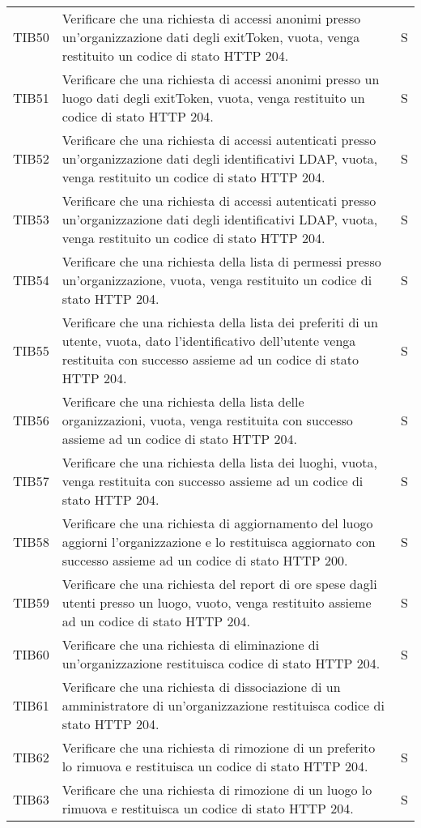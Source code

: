 {\begin{longtable}{ c C{13cm} C{1cm}}
TIB50 & Verificare che una richiesta di accessi anonimi presso un'organizzazione dati degli exitToken, vuota, venga restituito un codice di stato HTTP 204. & S \\
TIB51 & Verificare che una richiesta di accessi anonimi presso un luogo dati degli exitToken, vuota, venga restituito un codice di stato HTTP 204. & S \\
TIB52 & Verificare che una richiesta di accessi autenticati presso un'organizzazione dati degli identificativi LDAP, vuota, venga restituito un codice di stato HTTP 204. & S \\
TIB53 & Verificare che una richiesta di accessi autenticati presso un'organizzazione dati degli identificativi LDAP, vuota, venga restituito un codice di stato HTTP 204. & S \\
TIB54 & Verificare che una richiesta della lista di permessi presso un'organizzazione, vuota, venga restituito un codice di stato HTTP 204. & S \\
TIB55 & Verificare che una richiesta della lista dei preferiti di un utente, vuota, dato l'identificativo dell'utente venga restituita con successo assieme ad un codice di stato HTTP 204. & S \\
TIB56 & Verificare che una richiesta della lista delle organizzazioni, vuota, venga restituita con successo assieme ad un codice di stato HTTP 204. & S \\
TIB57 & Verificare che una richiesta della lista dei luoghi, vuota, venga restituita con successo assieme ad un codice di stato HTTP 204. & S \\
TIB58 & Verificare che una richiesta di aggiornamento del luogo aggiorni l'organizzazione e lo restituisca aggiornato con successo assieme ad un codice di stato HTTP 200. & S \\
TIB59 & Verificare che una richiesta del report di ore spese dagli utenti presso un luogo, vuoto, venga restituito assieme ad un codice di stato HTTP 204. & S \\
TIB60 & Verificare che una richiesta di eliminazione di un'organizzazione restituisca codice di stato HTTP 204. & S \\
TIB61 & Verificare che una richiesta di dissociazione di un amministratore di un'organizzazione restituisca codice di stato HTTP 204. \\
TIB62 & Verificare che una richiesta di rimozione di un preferito lo rimuova e restituisca un codice di stato HTTP 204. & S \\
TIB63 & Verificare che una richiesta di rimozione di un luogo lo rimuova e restituisca un codice di stato HTTP 204. & S \\

\end{longtable}}

